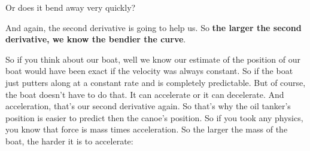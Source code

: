 \documentclass[pdftex, brazil, 12pt, twoside]{article}
\begin{document}
Or does it bend away very quickly?

\begin{figure}[H]
  \begin{center}
  \end{center}
\end{figure}

And again, the second derivative is going to help us.
So \textbf{the larger the second derivative,
  we know the bendier the curve}.

So if you think about our boat, well we
know our estimate of the position of our boat
would have been exact if the velocity was always constant.
So if the boat just putters along at a constant rate
and is completely predictable.
But of course, the boat doesn't have to do that.
It can accelerate or it can decelerate.
And acceleration, that's our second derivative again.
So that's why the oil tanker's position is easier
to predict then the canoe's position.
So if you took any physics, you know that force
is mass times acceleration.
So the larger the mass of the boat,
the harder it is to accelerate:

\begin{figure}[H]
  \begin{center}
  \end{center}
\end{figure}
\end{document}
